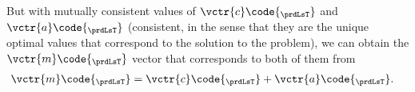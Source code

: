 \documentclass[titlepage, headings=optiontotocandhead]{Resources/texmf-local/tex/latex/econtex}
\begin{document}

But with mutually consistent values of $\vctr{c}\code{_{\prdLsT}}$ and $\vctr{a}\code{_{\prdLsT}}$ (consistent, in the sense that they are the unique optimal values that correspond to the solution to the problem), we can obtain the $\vctr{m}\code{_{\prdLsT}}$ vector that corresponds to both of them from
\begin{equation}\begin{gathered}\begin{aligned}
      \vctr{m}\code{_{\prdLsT}}  & = {\vctr{c}\code{_{\prdLsT}}+\vctr{a}\code{_{\prdLsT}}}.
    \end{aligned}\end{gathered}\end{equation}
\end{document}
